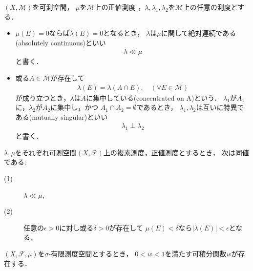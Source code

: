 	\begin{screen}
		\begin{dfn}[絶対連続・特異]
			$(X,\mathcal{M})$を可測空間，
			$\mu$を$\mathcal{M}$上の正値測度
			，$\lambda,\lambda_1,\lambda_2$を$\mathcal{M}$上の任意の測度とする．
			\begin{itemize}
				\item $\mu(E)=0$ならば$\lambda(E)=0$となるとき，
					$\lambda$は$\mu$に関して絶対連続である(absolutely continuous)といい
					\begin{align}
						\lambda \ll \mu
					\end{align}
					と書く．
				
				\item 或る$A \in \mathcal{M}$が存在して
					\begin{align}
						\lambda(E) = \lambda(A \cap E),\quad (\forall E \in \mathcal{M})
					\end{align}
					が成り立つとき，$\lambda$は$A$に集中している(concentrated on A)という．
					$\lambda_1$が$A_1$に，$\lambda_2$が$A_2$に集中し，かつ
					$A_1 \cap A_2 = \emptyset$であるとき，
					$\lambda_1,\lambda_2$は互いに特異である(mutually singular)といい
					\begin{align}
						\lambda_1 \perp \lambda_2
					\end{align}
					と書く．
			\end{itemize}
		\end{dfn}
	\end{screen}
	
	\begin{screen}
		\begin{thm}[絶対連続性の同値条件]\label{thm:equivalent_condition_of_absolute_continuity}
			$\lambda,\mu$をそれぞれ可測空間$(X,\mathscr{F})$上の複素測度，正値測度とするとき，
			次は同値である:
			\begin{description}
				\item[(1)] $\lambda \ll \mu$,
				\item[(2)] 任意の$\epsilon > 0$に対し或る$\delta > 0$が存在して
					$\mu(E) < \delta$なら$|\lambda(E)| < \epsilon$となる．
			\end{description}
		\end{thm}
	\end{screen}
	
	\begin{screen}
		\begin{lem}\label{lem:Lebesgue_Radon_Nikodym}
			$(X,\mathscr{F},\mu)$を$\sigma$-有限測度空間とするとき，
			$0 < w < 1$を満たす可積分関数$w$が存在する．
		\end{lem}
	\end{screen}
	

